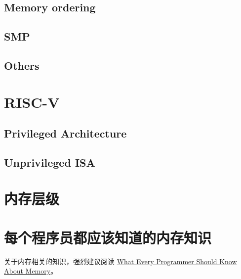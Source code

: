 \subsection{Memory ordering} \label{sec:memory-ordering}

\subsection{SMP}

\subsection{Others}

\section{RISC-V}

\subsection{Privileged Architecture}

\subsection{Unprivileged ISA}

\section{内存层级}

\section{每个程序员都应该知道的内存知识}

关于内存相关的知识，强烈建议阅读
\href{https://people.freebsd.org/~lstewart/articles/cpumemory.pdf}{What Every Programmer Should Know About Memory}。


